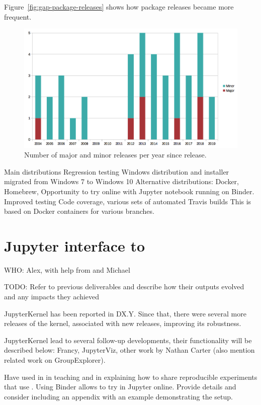\documentclass{deliverablereport}
\begin{document}
Figure~\ref{fig:gap-package-releases} shows how package releases became more frequent.

\begin{figure}[!ht]
    \centering
    \includegraphics[width=\textwidth]{images/gap-releases}
    \caption{Number of major and minor \GAP releases per year since  release.}
    \label{fig:gap-releases}
\end{figure}

Main distributions
Regression testing
Windows distribution and installer migrated from Windows 7 to Windows 10
Alternative distributions: Docker, Homebrew, 
Opportunity to try \GAP online with Jupyter notebook running on Binder.
Improved testing
Code coverage, various sets of automated Travis builds
This is based on Docker containers for various branches.

\section{Jupyter interface to \GAP}

WHO: Alex, with help from and Michael

TODO: Refer to previous deliverables and describe how their outputs
evolved and any impacts they achieved

JupyterKernel has been reported in DX.Y. Since that, there were
several more releases of the kernel, associated with new \GAP
releases, improving its robustness. 

JupyterKernel lead to several follow-up developments, their
functionality will be described below: Francy, JupyterViz,
other work by Nathan Carter (also mention related work on
GroupExplorer).

Have used in in teaching and in explaining how to share 
reproducible experiments that use \GAP. Using Binder
allows to try \GAP in Jupyter online. Provide details
and consider including an appendix with an example 
demonstrating the setup.
\end{document}
